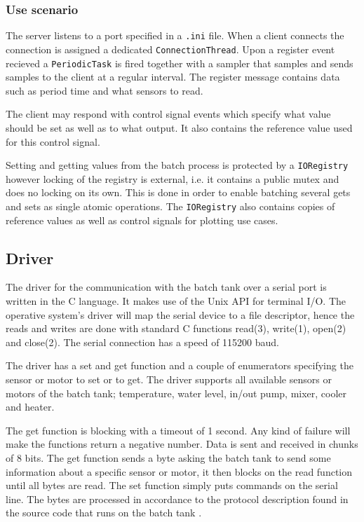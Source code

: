 \documentclass{article}
\begin{document}
\subsubsection{Use scenario}
The server listens to a port specified in a \verb+.ini+ file. When a client
connects the connection is assigned a dedicated \verb+ConnectionThread+. 
Upon a register event recieved a \verb+PeriodicTask+ is fired together
with a sampler that samples and sends samples to the client at a regular
interval. The register message contains data such as period time and
what sensors to read.

The client may respond with control signal events which specify what
value should be set as well as to what output. It also contains the
reference value used for this control signal.

Setting and getting values from the batch process is protected by a
\verb+IORegistry+ however locking of the registry is external, i.e. it
contains a public mutex and does no locking on its own. This is done in
order to enable batching several gets and sets as single atomic
operations. The \verb+IORegistry+ also contains copies of reference
values as well as control signals for plotting use cases.


\subsection{Driver}
The driver for the communication with the batch tank over a serial port is written in the C language.
It makes use of the Unix API for terminal I/O. The operative system's driver will
map the serial device to a file descriptor, hence the reads and writes are done
with standard C functions read(3), write(1), open(2) and close(2).  The serial
connection has a speed of 115200 baud. 

The driver has a set and get function and a couple of enumerators specifying the
sensor or motor to set or to get. The driver supports all available sensors or motors of
the batch tank; temperature, water level, in/out pump, mixer, cooler and heater.

The get function is blocking with a timeout of 1 second. Any kind of failure will
make the functions return a negative number. Data is sent and received in chunks
of 8 bits. The get function sends a byte asking the batch tank to send some
information about a specific sensor or motor, it then blocks on the read function
until all bytes are read. The set function simply puts commands on the serial
line. The bytes are processed in accordance to the protocol description found in the source code that runs on the
batch tank \cite[line 150-223]{kokare.c}. 
\end{document}
